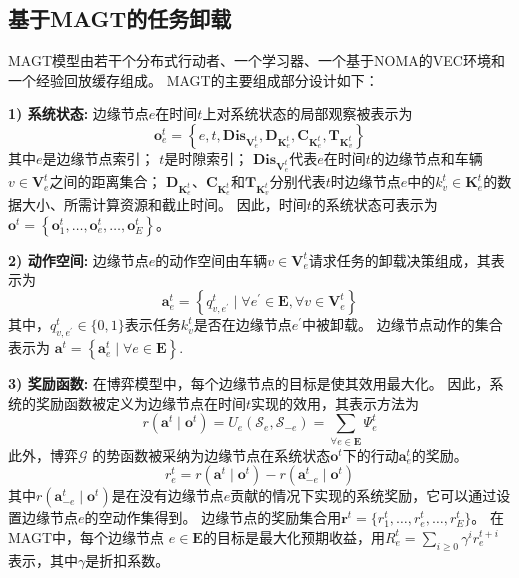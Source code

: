 \subsection{基于MAGT的任务卸载}
MAGT模型由若干个分布式行动者、一个学习器、一个基于NOMA的VEC环境和一个经验回放缓存组成。
MAGT的主要组成部分设计如下：

\textbf{1) 系统状态:} 边缘节点$e$在时间$t$上对系统状态的局部观察被表示为
	\begin{equation}
		\boldsymbol{o}_{e}^{t}=\left\{e, t, \mathbf{Dis}_{\mathbf{V}_{e}^{t}}, \mathbf{D}_{\mathbf{K}_{e}^{t}}, \mathbf{C}_{\mathbf{K}_{e}^{t}}, \mathbf{T}_{\mathbf{K}_{v}^{t}}\right\}
	\end{equation} 
	\noindent 其中$e$是边缘节点索引；
	$t$是时隙索引；
	$\mathbf{Dis}_{\mathbf{V}_{e}^{t}}$代表$e$在时间$t$的边缘节点和车辆$v \in \mathbf{V}_{e}^{t}$之间的距离集合；
	$\mathbf{D}_{\mathbf{K}_{e}^{t}}$、$\mathbf{C}_{\mathbf{K}_{e}^{t}}$和$\mathbf{T}_{\mathbf{K}_{v}^{t}}$分别代表$t$时边缘节点$e$中的$k_{v}^{t} \in \mathbf{K}_{e}^{t}$的数据大小、所需计算资源和截止时间。
	因此，时间$t$的系统状态可表示为$\boldsymbol{o}^{t}=\left\{\boldsymbol{o}_{1}^{t}, \ldots, \boldsymbol{o}_{e}^{t}, \ldots, \boldsymbol{o}_{E}^{t}\right\}$。

\textbf{2) 动作空间:} 边缘节点$e$的动作空间由车辆$v \in \mathbf{V}_{e}^{t}$请求任务的卸载决策组成，其表示为
	\begin{equation}
		\boldsymbol{a}_{e}^{t} = \left\{ q_{v, e^{\prime}}^t \mid \forall e^{\prime} \in \mathbf{E}, \forall v \in \mathbf{V}_{e}^{t} \right\}
	\end{equation}
	\noindent 其中，$q_{v, e^{\prime}}^t \in \{0, 1\}$表示任务$k_{v}^t$是否在边缘节点$e^{\prime}$中被卸载。
	边缘节点动作的集合表示为 $\boldsymbol{a}^{t} = \left\{\boldsymbol{a}_{e}^{t}\mid \forall e \in \mathbf{E} \right\}$.
	
\textbf{3) 奖励函数:} 在博弈模型中，每个边缘节点的目标是使其效用最大化。
	因此，系统的奖励函数被定义为边缘节点在时间$t$实现的效用，其表示方法为
	\begin{equation}
		r\left(\boldsymbol{a}^{t} \mid \boldsymbol{o}^{t}\right)= {U}_{e}\left(\mathcal{S}_{e}, \mathcal{S}_{-e}\right) = \sum_{\forall e \in \mathbf{E}} \Psi_{e}^{t}
		\label{equ 3-32}
	\end{equation}
	此外，博弈$\mathcal{G}$ 的势函数被采纳为边缘节点在系统状态$\boldsymbol{o}^{t}$下的行动$\boldsymbol{a}_{e}^{t}$的奖励。
	\begin{equation}
		r_{e}^{t} = r\left(\boldsymbol{a}^{t} \mid \boldsymbol{o}^{t}\right)-r\left(\boldsymbol{a}_{-e}^{t} \mid \boldsymbol{o}^{t}\right)
		\label{equ 3-33}
	\end{equation}
	\noindent 其中$r\left(\boldsymbol{a}_{-e}^{t} \mid \boldsymbol{o}^{t}\right)$是在没有边缘节点$e$贡献的情况下实现的系统奖励，它可以通过设置边缘节点$e$的空动作集得到。
	边缘节点的奖励集合用$\boldsymbol{r}^{t} = \{r_{1}^{t}, \ldots, r_{e}^{t}, \ldots, r_{E}^{t}\}$。
	在MAGT中，每个边缘节点 $e \in \mathbf{E}$的目标是最大化预期收益，用$R_{e}^{t} = \sum_{i \geq 0} \gamma^{i} r_{e}^{t+i}$表示，其中$\gamma$是折扣系数。

